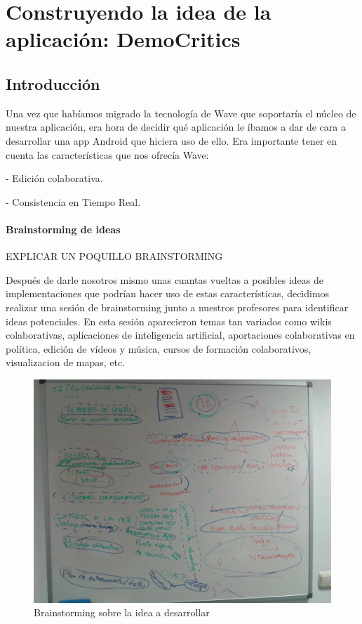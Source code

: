 \newpage
\thispagestyle{sectioned}
\chapter{Construyendo la idea de la aplicación: DemoCritics}

\section{Introducción}

Una vez que habíamos migrado la tecnología de Wave que soportaría el núcleo de nuestra aplicación, era hora de decidir qué aplicación le íbamos a dar de cara a desarrollar una app Android que hiciera uso de ello. Era importante tener en cuenta las características que nos ofrecía Wave:

 - Edición colaborativa.

 - Consistencia en Tiempo Real.
 
\subsubsection{Brainstorming de ideas}

EXPLICAR UN POQUILLO BRAINSTORMING

Después de darle nosotros mismo unas cuantas vueltas a posibles ideas de implementaciones que podrían hacer uso de estas características, decidimos realizar una sesión de brainstorming junto a nuestros profesores para identificar ideas potenciales. En esta sesión aparecieron temas tan variados como wikis colaborativas, aplicaciones de inteligencia artificial, aportaciones colaborativas en política, edición de vídeos y música, cursos de formación colaborativos, visualizacion de mapas, etc.

\begin{figure}[H]
\centering
\includegraphics[keepaspectratio, scale=0.15]{Media/Captures/brainstorming.jpg}
\caption{Brainstorming sobre la idea a desarrollar}
\label{fig:brainstorming}
\end{figure}

